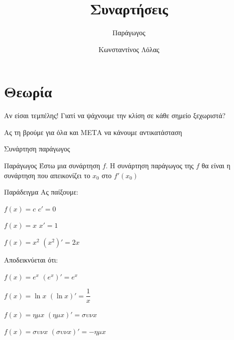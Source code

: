 \documentclass{presentation}
\title{Συναρτήσεις}
\subtitle{Παράγωγος}
\author[Λόλας]{Κωνσταντίνος Λόλας}
\begin{document}
\begin{frame}
  \titlepage
\end{frame}

\section{Θεωρία}
\begin{frame}{Αν είσαι τεμπέλης!}
  Γιατί να ψάχνουμε την κλίση σε κάθε σημείο ξεχωριστά? \pause

  Ας τη βρούμε για όλα και ΜΕΤΑ να κάνουμε αντικατάσταση
\end{frame}

\begin{frame}{Συνάρτηση παράγωγος}
  \begin{block}{Παράγωγος}
    Έστω μια συνάρτηση $f$. Η συνάρτηση παράγωγος της $f$ θα είναι η συνάρτηση που απεικονίζει το $x_0$ στο $f'(x_0)$
  \end{block}
\end{frame}

\begin{frame}{Παράδειγμα}
  Ας παίξουμε:
  \begin{block}{$f(x)=c$}
    $c'=0$
  \end{block} \pause

  \begin{block}{$f(x)=x$}
    $x'=1$
  \end{block} \pause

  \begin{block}{$f(x)=x^2$}
    $(x^2)'=2x$
  \end{block}
\end{frame}

\begin{frame}{Αποδεικνύεται ότι:}
  \begin{block}{$f(x)=e^x$}
    $(e^x)'=e^x$
  \end{block} \pause

  \begin{block}{$f(x)=\ln x$}
    $(\ln x)'=\dfrac{1}{x}$
  \end{block} \pause

  \begin{block}{$f(x)=ημx$}
    $(ημx)'=συνx$
  \end{block} \pause

  \begin{block}{$f(x)=συνx$}
    $(συνx)'=-ημx$
  \end{block}
\end{frame}
\end{document}
